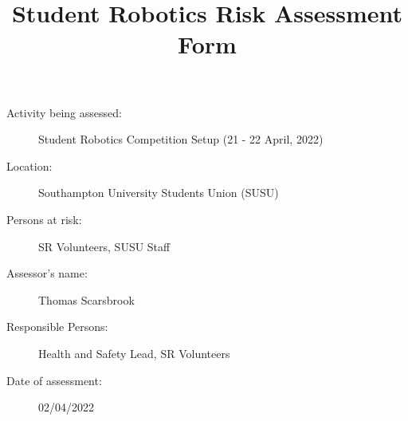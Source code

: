 \documentclass[12pt,a4paper]{scrartcl}
\title{Student Robotics Risk Assessment Form}
\begin{document}
\maketitle

\begin{description}
\item[Activity being assessed:] Student Robotics Competition Setup (21 - 22 April, 2022)
\item[Location:] Southampton University Students Union (SUSU)
\item[Persons at risk:] SR Volunteers, SUSU Staff
\end{description}

\begin{description}
\item[Assessor's name:] Thomas Scarsbrook
\item[Responsible Persons:] Health and Safety Lead, SR Volunteers
\item[Date of assessment:] 02/04/2022
\end{description}
\clearpage

\renewcommand{\cellalign}{tl}
\renewcommand{\theadalign}{tl}

\newcommand{\risk}[4]{
	#1 & #2 & #3 & #4 \\
}
\end{document}
